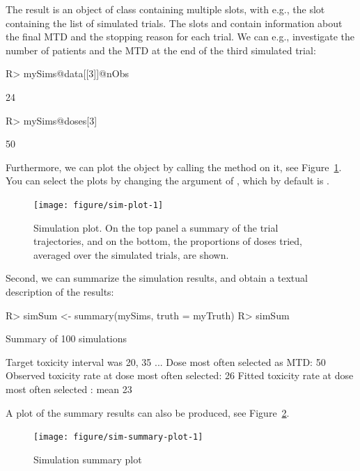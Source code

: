 \documentclass[article]{jss}\usepackage[]{graphicx}\usepackage[]{color}
\begin{document}
The result is an object of class  containing multiple slots, with e.g., the  slot containing the list of simulated trials. The slots  and  contain information about the final MTD and the stopping reason for each trial. We can  e.g., investigate the number of patients and the MTD at the end of the third simulated trial:
\begin{Schunk}
\begin{Sinput}
R> mySims@data[[3]]@nObs
\end{Sinput}
\begin{Soutput}
[1] 24
\end{Soutput}
\begin{Sinput}
R> mySims@doses[3]      
\end{Sinput}
\begin{Soutput}
[1] 50
\end{Soutput}
\end{Schunk}
Furthermore, we can plot the  object by calling the  method on it, see Figure~\ref{fig:sim-plot}. You can select the plots by changing the  argument of , which by default is .
\begin{Schunk}
\begin{figure}

{\centering \texttt{[image: figure/sim-plot-1]} 

}

\caption[Simulation plot]{Simulation plot. On the top panel a summary of the trial trajectories, and on the bottom, the proportions of doses tried, averaged over the simulated trials, are shown.}\label{fig:sim-plot}
\end{figure}
\end{Schunk}

Second, we can summarize the simulation results, and obtain a textual description of the 
results: 
\begin{Schunk}
\begin{Sinput}
R> simSum <- summary(mySims, truth = myTruth)
R> simSum
\end{Sinput}
\begin{Soutput}
Summary of 100 simulations

Target toxicity interval was 20, 35 %
...
Dose most often selected as MTD: 50 
Observed toxicity rate at dose most often selected: 26 %
Fitted toxicity rate at dose most often selected : mean 23 %
\end{Soutput}
\end{Schunk}
A plot of the summary results can also be produced, see Figure~\ref{fig:sim-summary-plot}.
\begin{Schunk}
\begin{figure}

{\centering \texttt{[image: figure/sim-summary-plot-1]} 

}

\caption[Simulation summary plot]{Simulation summary plot}\label{fig:sim-summary-plot}
\end{figure}
\end{Schunk}
\end{document}
